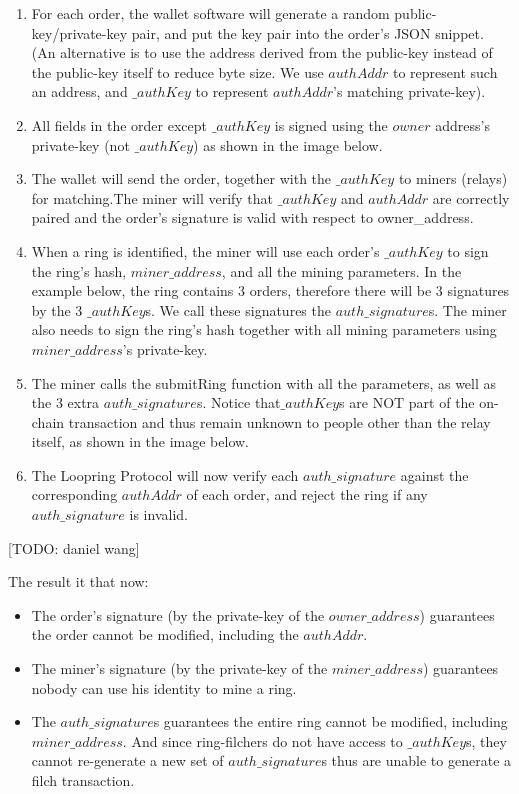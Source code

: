 \documentclass[UTF8,nofonts]{article}
\begin{document}
\begin{enumerate}

	\item For each order, the wallet software will generate a random public- key/private-key pair, and put the key pair into the order's JSON snippet. (An alternative is to use the address derived from the public-key instead of the public-key itself to reduce byte size. We use $authAddr$ to represent such an address, and $\_authKey$ to represent $authAddr$'s matching private-key).

	\item All fields in the order except $\_authKey$ is signed using the $owner$ address's private-key (not $\_authKey$) as shown in the image below.

	\item The wallet will send the order, together with the $\_authKey$ to miners (relays) for matching.The miner will verify that $\_authKey$ and $authAddr$ are correctly paired and the order's signature is valid with respect to owner\_address.

	\item When a ring is identified, the miner will use each order's $\_authKey$ to sign the ring's hash, $miner\_address$, and all the mining parameters. In the example below, the ring contains 3 orders, therefore there will be 3 signatures by the 3 $\_authKey$s. We call these signatures the $auth\_signature$s. The miner also needs to sign the ring's hash together with all mining parameters using $miner\_address$'s private-key.

	\item The miner calls the submitRing function with all the parameters, as well as the 3 extra $auth\_signature$s. Notice that$\_authKey$s are NOT part of the on-chain transaction and thus remain unknown to people other than the relay itself, as shown in the image below.

	\item The Loopring Protocol will now verify each $auth\_signature$ against the corresponding $authAddr$ of each order, and reject the ring if any $auth\_signature$ is invalid.
 
\end{enumerate}
[TODO: daniel wang]


The result it that now:

\begin{itemize}

	\item  The order’s signature (by the private-key of the $owner\_address$) guarantees the order cannot be modified, including the $authAddr$.
	\item  The miner’s signature (by the private-key of the $miner\_address$) guarantees nobody can use his identity to mine a ring.
	\item  The $auth\_signature$s guarantees the entire ring cannot be modified, including $miner\_address$. And since ring-filchers do not have access to $\_authKey$s, they cannot re-generate a new set of $auth\_signature$s thus are unable to generate a filch transaction.

\end{itemize}
\end{document}
